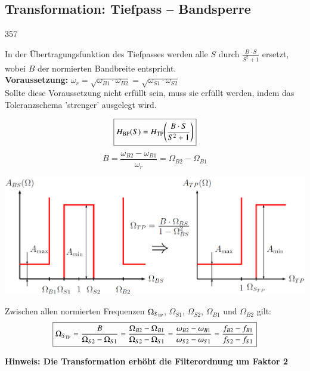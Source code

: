 \subsection{Transformation: Tiefpass -- Bandsperre}{357}

In der Übertragungsfunktion des Tiefpasses werden alle $S$ durch $\frac{B \cdot S}{S^2 + 1}$ ersetzt, wobei $B$ der normierten
Bandbreite entspricht. \\
\textbf{Voraussetzung:} $\omega_r = \sqrt{\omega_{B1} \cdot \omega_{B2}} = \sqrt{\omega_{S1} \cdot \omega_{S2} } $\\
Sollte diese Voraussetzung nicht erfüllt sein, muss sie erfüllt werden, indem das Toleranzschema 'strenger' ausgelegt wird.

\begin{minipage}[c]{0.4\columnwidth}
    $$ \boxed{H_{\rm BP}(S) = H_{\rm TP} \Bigg(\frac{B \cdot S}{S^2 + 1} \Bigg) } $$
    $$ \boxed{ B = \frac{\omega_{B2} - \omega_{B1}}{\omega_r} = \Omega_{B2} - \Omega_{B1} } $$
\end{minipage}
\hfill
\begin{minipage}[c]{0.58\columnwidth}
    \includegraphics[width=\columnwidth]{images/toleranzschema_BS_TP.png}
\end{minipage}

\vspace{0.2cm}
Zwischen allen normierten Frequenzen $\Omega_{S_{\rm TP}}$, $\Omega_{S1}$, $\Omega_{S2}$, $\Omega_{B1}$ und $\Omega_{B2}$ gilt:
$$ \boxed{ \Omega_{S_{\rm TP}} = \frac{B}{\Omega_{S2} - \Omega_{S1}} = \frac{\Omega_{B2} - \Omega_{B1}}{\Omega_{S2} - \Omega_{S1}}
    = \frac{\omega_{B2} - \omega_{B1}}{\omega_{S2} - \omega_{S1}} = \frac{f_{B2} - f_{B1}}{f_{S2} - f_{S1}} } $$

\textbf{Hinweis: Die Transformation erhöht die Filterordnung um Faktor 2}


